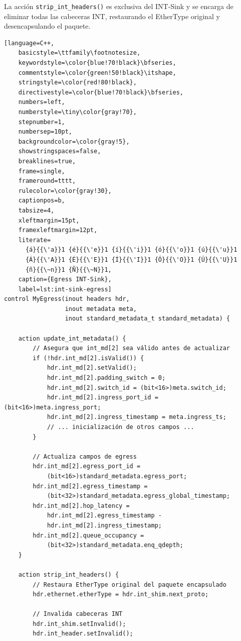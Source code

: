 La acción \texttt{strip\_int\_headers()} es exclusiva del INT-Sink y se encarga de eliminar todas las cabeceras INT, restaurando el EtherType original y desencapsulando el paquete.

\begin{lstlisting}[language=C++,
    basicstyle=\ttfamily\footnotesize,
    keywordstyle=\color{blue!70!black}\bfseries,
    commentstyle=\color{green!50!black}\itshape,
    stringstyle=\color{red!80!black},
    directivestyle=\color{blue!70!black}\bfseries,
    numbers=left,
    numberstyle=\tiny\color{gray!70},
    stepnumber=1,
    numbersep=10pt,
    backgroundcolor=\color{gray!5},
    showstringspaces=false,
    breaklines=true,
    frame=single,
    frameround=tttt,
    rulecolor=\color{gray!30},
    captionpos=b,
    tabsize=4,
    xleftmargin=15pt,
    framexleftmargin=12pt,
    literate=
      {á}{{\'a}}1 {é}{{\'e}}1 {í}{{\'i}}1 {ó}{{\'o}}1 {ú}{{\'u}}1
      {Á}{{\'A}}1 {É}{{\'E}}1 {Í}{{\'I}}1 {Ó}{{\'O}}1 {Ú}{{\'U}}1
      {ñ}{{\~n}}1 {Ñ}{{\~N}}1,
    caption={Egress INT-Sink}, 
    label=lst:int-sink-egress]
control MyEgress(inout headers hdr,
                 inout metadata meta,
                 inout standard_metadata_t standard_metadata) {

    action update_int_metadata() {
        // Asegura que int_md[2] sea válido antes de actualizar
        if (!hdr.int_md[2].isValid()) {
            hdr.int_md[2].setValid();
            hdr.int_md[2].padding_switch = 0;
            hdr.int_md[2].switch_id = (bit<16>)meta.switch_id;
            hdr.int_md[2].ingress_port_id = (bit<16>)meta.ingress_port;
            hdr.int_md[2].ingress_timestamp = meta.ingress_ts;
            // ... inicialización de otros campos ...
        }

        // Actualiza campos de egress
        hdr.int_md[2].egress_port_id = 
            (bit<16>)standard_metadata.egress_port;
        hdr.int_md[2].egress_timestamp = 
            (bit<32>)standard_metadata.egress_global_timestamp;
        hdr.int_md[2].hop_latency = 
            hdr.int_md[2].egress_timestamp - 
            hdr.int_md[2].ingress_timestamp;
        hdr.int_md[2].queue_occupancy = 
            (bit<32>)standard_metadata.enq_qdepth;
    }

    action strip_int_headers() {
        // Restaura EtherType original del paquete encapsulado
        hdr.ethernet.etherType = hdr.int_shim.next_proto;
        
        // Invalida cabeceras INT
        hdr.int_shim.setInvalid();
        hdr.int_header.setInvalid();
        

\end{lstlisting}
